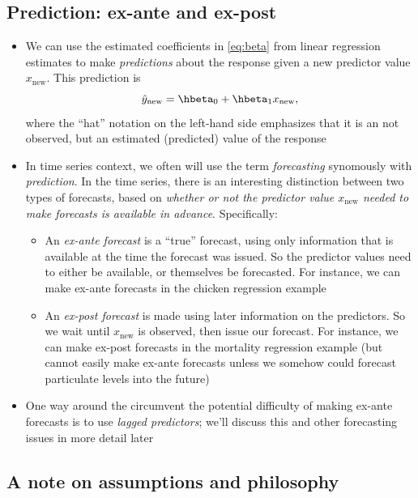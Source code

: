 \documentclass{article}
\begin{document}
\subsection{Prediction: ex-ante and ex-post}

\def\new{\text{new}}

\begin{itemize}
\item We can use the estimated coefficients   in
  \eqref{eq:beta} from linear regression estimates to make \emph{predictions}
  about the response given a new predictor value $x_{\new}$. This
  prediction is  
  \[
  \hat{y}_{\new} = \hbeta_0 + \hbeta_1 x_{\new},
  \]
  where the ``hat'' notation on the left-hand side emphasizes that it is an not  
  observed, but an estimated (predicted) value of the response

\item In time series context, we often will use the term \emph{forecasting}
  synomously with \emph{prediction}. In the time series, there is an interesting
  distinction between two types of forecasts, based on \emph{whether or not the
    predictor value $x_{\new}$ needed to make forecasts is available in
    advance}. Specifically:   
  \begin{itemize}
  \item An \emph{ex-ante forecast} is a ``true'' forecast, using only
    information that is available at the time the forecast was issued. So the
    predictor values need to either be available, or themselves be
    forecasted. For instance, we can make ex-ante forecasts in the chicken 
    regression example

  \item An \emph{ex-post forecast} is made using later information on the
    predictors. So we wait until $x_{\new}$ is observed, then issue our
    forecast. For instance, we can make ex-post forecasts in the mortality
    regression example (but cannot easily make ex-ante forecasts unless we 
    somehow could forecast particulate levels into the future)
  \end{itemize}

\item One way around the circumvent the potential difficulty of making ex-ante
  forecasts is to use \emph{lagged predictors}; we'll discuss this and other
  forecasting issues in more detail later
\end{itemize}

\subsection{A note on assumptions and philosophy}
\end{document}
